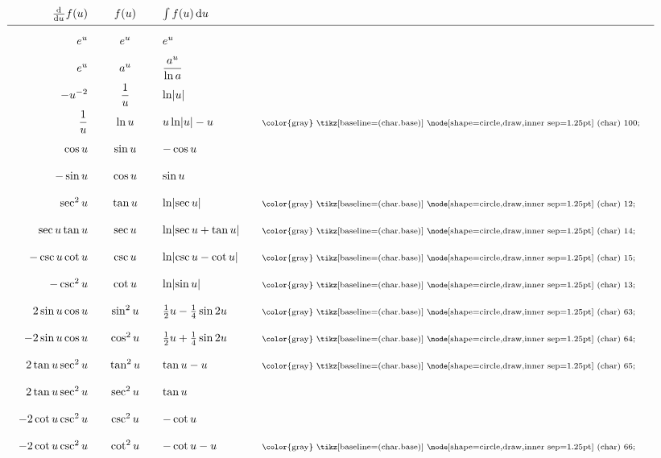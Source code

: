 \begingroup
\newcommand\n[1]{\text{\scriptsize\color{gray}\circled{#1}}}
\[%
\arraycolsep=1em\def\arraystretch{2}
\begin{array}{rcll}
    \od{}{u}{f(u)}   &        {f(u)}&   \int{f(u)}\dif u                  &
\\\hline
     e^u              &         e^u   &         e^u                         &
\\   e^u              &         a^u   &   \dfrac{a^u}{\ln a}                 &
\\  -u^{-2}           & \dfrac{1}{u}  &   \ln\abs{u}                        &
\\   \dfrac{1}{u}     &       \ln u   &  u\ln\abs{u}-u                      &\n{100}
\\   \cos u           &      \sin u   &  -\cos u                            &
\\  -\sin u           &      \cos u   &   \sin u                            &
\\   \sec^2u          &      \tan u   &   \ln\abs{\sec u}                   & \n{12}
\\   \sec u \tan u    &      \sec u   &   \ln\abs{\sec u + \tan u}          & \n{14}
\\  -\csc u \cot u    &      \csc u   &   \ln\abs{\csc u - \cot u}          & \n{15}
\\  -\csc^2u          &      \cot u   &   \ln\abs{\sin u}                   & \n{13}
\\  2\sin u \cos u    &    \sin^2{u}  &   \frac{1}{2}u - \frac{1}{4}\sin2u  & \n{63}
\\ -2\sin u \cos u    &    \cos^2{u}  &   \frac{1}{2}u + \frac{1}{4}\sin2u  & \n{64}
\\  2\tan u \sec^2 u  &    \tan^2{u}  &   \tan u - u                        & \n{65}
\\  2\tan u \sec^2 u  &    \sec^2{u}  &   \tan u                            &
\\ -2\cot u \csc^2 u  &    \csc^2{u}  &  -\cot u                            &
\\ -2\cot u \csc^2 u  &    \cot^2{u}  &  -\cot u - u                        & \n{66}
%
\end{array}
\]
\endgroup
